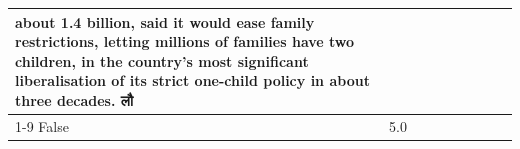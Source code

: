 \begin{table}[H]
\begin{tabular}{lllrlllll}
about 1.4 billion, said it would ease family restrictions, letting millions of families have two children, in the country's most significant liberalisation of its strict one-child policy in about three decades. लौ \\
\cline{1-9}
False & 5.0%
\end{tabular}
\end{table}
